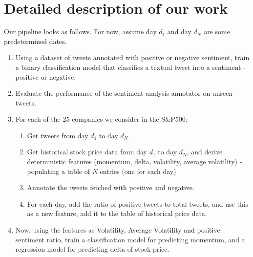 \documentclass{article}
\begin{document}
\section{Detailed description of our work}
Our pipeline looks as follows. For now, assume day $d_1$ and day $d_N$ are some predetermined dates.
\begin{enumerate}
    \item Using a dataset of tweets annotated with positive or negative sentiment, train a binary classification model that classifies a textual tweet into a sentiment - positive or negative.
    \item Evaluate the performance of the sentiment analysis annotator on unseen tweets.
    \item For each of the 25 companies we consider in the S\&P500:
    \begin{enumerate}
        \item Get tweets from day $d_1$ to day $d_N$.
        \item Get historical stock price data from day $d_1$ to day $d_N$, and derive deterministic features (momentum, delta, volatility, average volatility) - populating a table of $N$ entries (one for each day)
        \item Annotate the tweets fetched with positive and negative.
        \item For each day, add the ratio of positive tweets to total tweets, and use this as a new feature, add it to the table of historical price data.
    \end{enumerate}
    \item Now, using the features as Volatility, Average Volatility and positive sentiment ratio, train a classification model for predicting momentum, and a regression model for predicting delta of stock price.
\end{enumerate}
\end{document}
